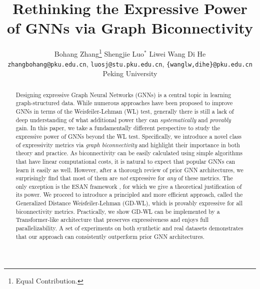 \documentclass{article} %
\title{Rethinking the Expressive Power of GNNs via Graph Biconnectivity}
\author{Bohang Zhang\thanks{Equal Contribution.} \qquad Shengjie Luo$^*$ \qquad Liwei Wang \qquad Di He\\
\small{\texttt{zhangbohang@pku.edu.cn}, \quad\texttt{luosj@stu.pku.edu.cn}, \quad
\texttt{\{wanglw,dihe\}@pku.edu.cn} }\\
Peking University
}
\begin{document}
\maketitle

\doparttoc %
\faketableofcontents %

\vspace{-5pt}

\begin{abstract}
Designing expressive Graph Neural Networks (GNNs) is a central topic in learning graph-structured data. While numerous approaches have been proposed to improve GNNs in terms of the Weisfeiler-Lehman (WL) test, generally there is still a lack of deep understanding of what additional power they can \emph{systematically} and \emph{provably} gain. In this paper, we take a fundamentally different perspective to study the expressive power of GNNs beyond the WL test. Specifically, we introduce a novel class of expressivity metrics via \emph{graph biconnectivity} and highlight their importance in both theory and practice. As biconnectivity can be easily calculated using simple algorithms that have linear computational costs, it is natural to expect that popular GNNs can learn it easily as well. However, after a thorough review of prior GNN architectures, we surprisingly find that most of them are \emph{not} expressive for \emph{any} of these metrics. The only exception is the ESAN framework \citep{bevilacqua2022equivariant}, for which we give a theoretical justification of its power. We proceed to introduce a principled and more efficient approach, called the Generalized Distance Weisfeiler-Lehman (GD-WL), which is provably expressive for all biconnectivity metrics. Practically, we show GD-WL can be implemented by a Transformer-like architecture that preserves expressiveness and enjoys full parallelizability. A set of experiments on both synthetic and real datasets demonstrates that our approach can consistently outperform prior GNN architectures.
\end{abstract}

\vspace{-5pt}
\end{document}
